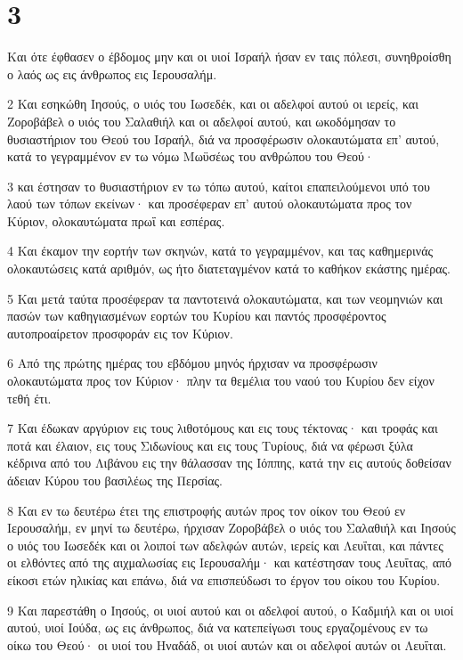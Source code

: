 \chapter{3}

\par Και ότε έφθασεν ο έβδομος μην και οι υιοί Ισραήλ ήσαν εν ταις πόλεσι, συνηθροίσθη ο λαός ως εις άνθρωπος εις Ιερουσαλήμ.
\par 2 Και εσηκώθη Ιησούς, ο υιός του Ιωσεδέκ, και οι αδελφοί αυτού οι ιερείς, και Ζοροβάβελ ο υιός του Σαλαθιήλ και οι αδελφοί αυτού, και ωκοδόμησαν το θυσιαστήριον του Θεού του Ισραήλ, διά να προσφέρωσιν ολοκαυτώματα επ' αυτού, κατά το γεγραμμένον εν τω νόμω Μωϋσέως του ανθρώπου του Θεού·
\par 3 και έστησαν το θυσιαστήριον εν τω τόπω αυτού, καίτοι επαπειλούμενοι υπό του λαού των τόπων εκείνων· και προσέφεραν επ' αυτού ολοκαυτώματα προς τον Κύριον, ολοκαυτώματα πρωΐ και εσπέρας.
\par 4 Και έκαμον την εορτήν των σκηνών, κατά το γεγραμμένον, και τας καθημερινάς ολοκαυτώσεις κατά αριθμόν, ως ήτο διατεταγμένον κατά το καθήκον εκάστης ημέρας.
\par 5 Και μετά ταύτα προσέφεραν τα παντοτεινά ολοκαυτώματα, και των νεομηνιών και πασών των καθηγιασμένων εορτών του Κυρίου και παντός προσφέροντος αυτοπροαίρετον προσφοράν εις τον Κύριον.
\par 6 Από της πρώτης ημέρας του εβδόμου μηνός ήρχισαν να προσφέρωσιν ολοκαυτώματα προς τον Κύριον· πλην τα θεμέλια του ναού του Κυρίου δεν είχον τεθή έτι.
\par 7 Και έδωκαν αργύριον εις τους λιθοτόμους και εις τους τέκτονας· και τροφάς και ποτά και έλαιον, εις τους Σιδωνίους και εις τους Τυρίους, διά να φέρωσι ξύλα κέδρινα από του Λιβάνου εις την θάλασσαν της Ιόππης, κατά την εις αυτούς δοθείσαν άδειαν Κύρου του βασιλέως της Περσίας.
\par 8 Και εν τω δευτέρω έτει της επιστροφής αυτών προς τον οίκον του Θεού εν Ιερουσαλήμ, εν μηνί τω δευτέρω, ήρχισαν Ζοροβάβελ ο υιός του Σαλαθιήλ και Ιησούς ο υιός του Ιωσεδέκ και οι λοιποί των αδελφών αυτών, ιερείς και Λευΐται, και πάντες οι ελθόντες από της αιχμαλωσίας εις Ιερουσαλήμ· και κατέστησαν τους Λευΐτας, από είκοσι ετών ηλικίας και επάνω, διά να επισπεύδωσι το έργον του οίκου του Κυρίου.
\par 9 Και παρεστάθη ο Ιησούς, οι υιοί αυτού και οι αδελφοί αυτού, ο Καδμιήλ και οι υιοί αυτού, υιοί Ιούδα, ως εις άνθρωπος, διά να κατεπείγωσι τους εργαζομένους εν τω οίκω του Θεού· οι υιοί του Ηναδάδ, οι υιοί αυτών και οι αδελφοί αυτών οι Λευΐται.
